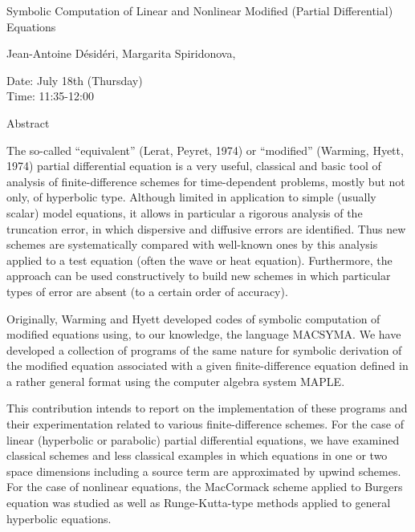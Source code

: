 \begin{center}
\LARGE
Symbolic Computation of Linear and Nonlinear Modified
                (Partial Differential) Equations

\end{center}

\begin{center}
\Large
Jean-Antoine D\'esid\'eri, Margarita Spiridonova, 

\end{center}

\noindent
Date:  July 18th (Thursday)\\
Time:  11:35-12:00\\

\begin{center}
\large
Abstract
\end{center}

The so-called ``equivalent'' (Lerat, Peyret, 1974) or ``modified'' (Warming, Hyett, 1974) partial
differential equation is a very useful, classical and basic tool of analysis of finite-difference
schemes for time-dependent problems, mostly but not only, of hyperbolic type. Although limited
in application to simple (usually scalar) model equations, it allows in particular a rigorous analysis
of the truncation error, in which dispersive and diffusive errors are identified. Thus new schemes
are systematically compared with well-known ones by this analysis applied to a test equation
(often the wave or heat equation). Furthermore, the approach can be used constructively to build
new schemes in which particular types of error are absent (to a certain order of accuracy). 

Originally, Warming and Hyett developed codes of symbolic computation of modified equations
using, to our knowledge, the language MACSYMA. We have developed a collection of programs
of the same nature for symbolic derivation of the modified equation associated with a given
finite-difference equation defined in a rather general format using the computer algebra system
MAPLE. 

This contribution intends to report on the implementation of these programs and their
experimentation related to various finite-difference schemes. For the case of linear (hyperbolic or
parabolic) partial differential equations, we have examined classical schemes and less classical
examples in which equations in one or two space dimensions including a source term are
approximated by upwind schemes. For the case of nonlinear equations, the MacCormack scheme
applied to Burgers equation was studied as well as Runge-Kutta-type methods applied to general
hyperbolic equations. 

